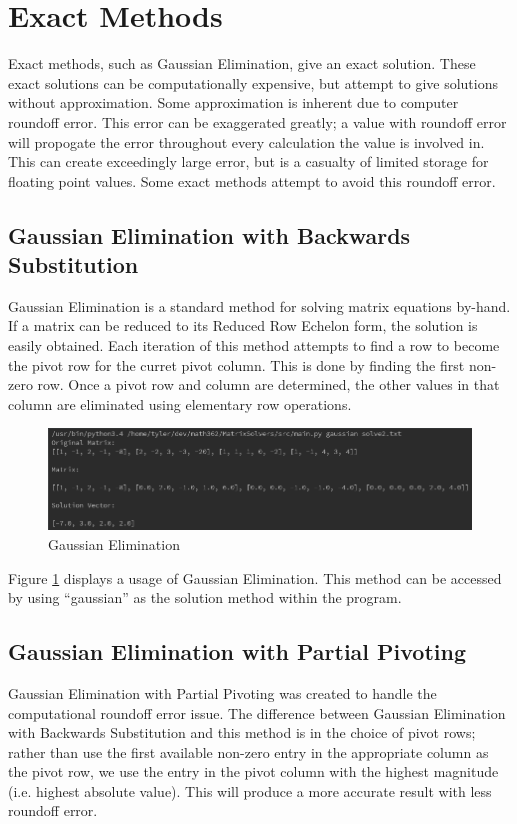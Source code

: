 \documentclass[12pt]{article}
\begin{document}
\section{Exact Methods}

Exact methods, such as Gaussian Elimination, give an exact solution. These 
exact solutions can be computationally expensive, but attempt to give solutions
without approximation. Some approximation is inherent due to computer roundoff
error. This error can be exaggerated greatly; a value with roundoff error 
will propogate the error throughout every calculation the value is involved in.
This can create exceedingly large error, but is a casualty of limited storage 
for floating point values. Some exact methods attempt to avoid this roundoff 
error.

\subsection{Gaussian Elimination with Backwards Substitution}
Gaussian Elimination is a standard method for solving matrix equations by-hand. If a 
matrix can be reduced to its Reduced Row Echelon form, the solution is easily
obtained. Each iteration of this method attempts to find a row to become the 
pivot row for the curret pivot column. This is done by finding the first non-zero
row. Once a pivot row and column are determined, the other values in that column
are eliminated using elementary row operations. 

\begin{figure}[H]
\begin{center}
\includegraphics[scale=.5]{gaussian.png}
\caption{Gaussian Elimination}
\label{gaussian}
\end{center}
\end{figure}

Figure \ref{gaussian} displays a usage of Gaussian Elimination. This method can be accessed by using ``gaussian'' as the solution method
within the program.



\subsection{Gaussian Elimination with Partial Pivoting}
Gaussian Elimination with Partial Pivoting was created to handle the 
computational roundoff error issue. The difference between Gaussian Elimination
with Backwards Substitution and this method is in the choice of pivot rows; 
rather than use the first available non-zero entry in the appropriate column
 as the pivot row, we use the entry in the pivot column with the highest magnitude (i.e. highest absolute value). 
 This will produce a more accurate result with less roundoff error. 
\end{document}
